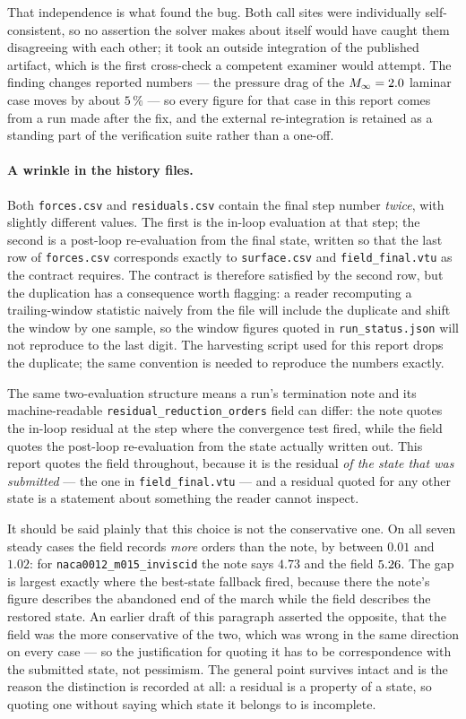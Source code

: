 That independence is what found the bug. Both call sites were individually
self-consistent, so no assertion the solver makes about itself would have caught them
disagreeing with each other; it took an outside integration of the published artifact,
which is the first cross-check a competent examiner would attempt. The finding changes
reported numbers --- the pressure drag of the $M_\infty=2.0$ laminar case moves by about
$5\,\%$ --- so every figure for that case in this report comes from a run made after the
fix, and the external re-integration is retained as a standing part of the verification
suite rather than a one-off.

\paragraph{A wrinkle in the history files.} Both \texttt{forces.csv} and
\texttt{residuals.csv} contain the final step number \emph{twice}, with slightly
different values. The first is the in-loop evaluation at that step; the second is a
post-loop re-evaluation from the final state, written so that the last row of
\texttt{forces.csv} corresponds exactly to \texttt{surface.csv} and
\texttt{field\_final.vtu} as the contract requires. The contract is therefore
satisfied by the second row, but the duplication has a consequence worth flagging: a
reader recomputing a trailing-window statistic naively from the file will include
the duplicate and shift the window by one sample, so the window figures quoted in
\texttt{run\_status.json} will not reproduce to the last digit. The harvesting script
used for this report drops the duplicate; the same convention is needed to reproduce
the numbers exactly.

The same two-evaluation structure means a run's termination note and its machine-readable
\texttt{residual\_reduction\_orders} field can differ: the note quotes the in-loop residual
at the step where the convergence test fired, while the field quotes the post-loop
re-evaluation from the state actually written out. This report quotes the field throughout,
because it is the residual \emph{of the state that was submitted} --- the one in
\texttt{field\_final.vtu} --- and a residual quoted for any other state is a statement about
something the reader cannot inspect.

It should be said plainly that this choice is not the conservative one. On all seven steady
cases the field records \emph{more} orders than the note, by between $0.01$ and $1.02$: for
\texttt{naca0012\_m015\_inviscid} the note says $4.73$ and the field
$\num{5.26}$. The gap is largest exactly where the best-state fallback fired,
because there the note's figure describes the abandoned end of the march while the field
describes the restored state. An earlier draft of this paragraph asserted the opposite, that
the field was the more conservative of the two, which was wrong in the same direction on every
case --- so the justification for quoting it has to be correspondence with the submitted
state, not pessimism. The general point survives intact and is the reason the distinction is
recorded at all: a residual is a property of a state, so quoting one without saying which
state it belongs to is incomplete.

